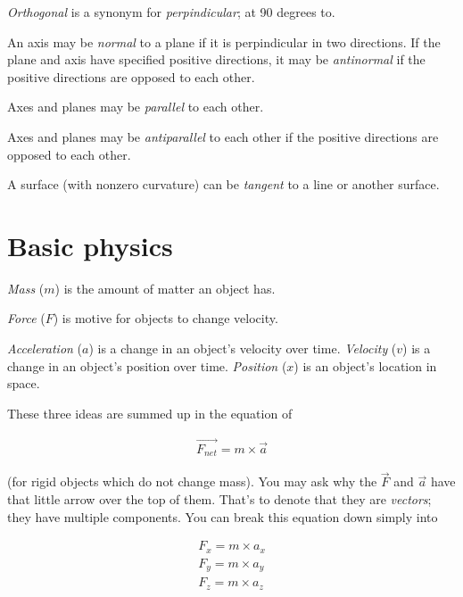 \begin{asparaenum}[a)]
	\item \textit{Orthogonal} is a synonym for \textit{perpindicular}; at 90 degrees to. 
	\item An axis may be \textit{normal} to a plane if it is perpindicular in two directions. 
	If the plane and axis have specified positive directions, it may be \textit{antinormal} if the positive directions are opposed to each other. 
	\item Axes and planes may be \textit{parallel} to each other. 
	\item Axes and planes may be \textit{antiparallel} to each other if the positive directions are opposed to each other. 
	\item A surface (with nonzero curvature) can be \textit{tangent} to a line or another surface. 
\end{asparaenum}

\section{Basic physics}

\begin{asparaenum}[a)]
	\item \textit{Mass} ($m$) is the amount of matter an object has.
	\item \textit{Force} ($F$) is motive for objects to change velocity.
	\item \textit{Acceleration} ($a$) is a change in an object's velocity over time.
	\textit{Velocity} ($v$) is a change in an object's position over time.
	\textit{Position} ($x$) is an object's location in space.
\end{asparaenum}

These three ideas are summed up in the equation of

\begin{align}
	\vec{F_{net}} = m \times \vec{a}
\end{align}

(for rigid objects which do not change mass). You may ask why the $\vec{F}$ and $\vec{a}$ have that little arrow over the top of them. That's to denote that they are \textit{vectors}; they have multiple components. You can break this equation down simply into

\begin{align}
	F_x = m \times a_x \\
	F_y = m \times a_y \\
	F_z = m \times a_z
\end{align}

